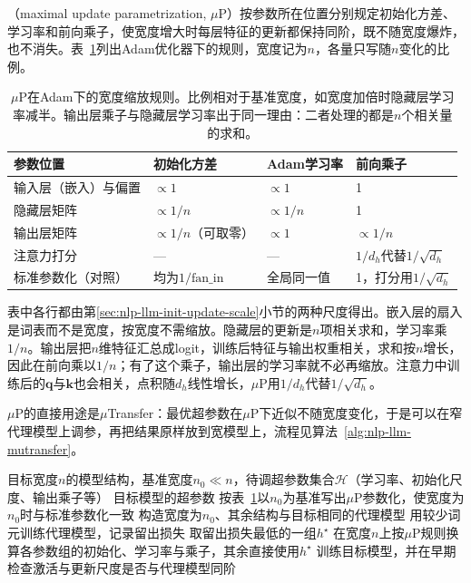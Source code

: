 （maximal update parametrization, $\mu$P）按参数所在位置分别规定初始化方差、学习率和前向乘子，使宽度增大时每层特征的更新都保持同阶，既不随宽度爆炸，也不消失。表~\ref{tab:nlp-llm-mup}列出Adam优化器下的规则，宽度记为$n$，各量只写随$n$变化的比例。

\begin{table}[htbp]
 \centering
 \small
 \begin{tabular}{@{}llll@{}}
  \toprule
  参数位置 & 初始化方差 & Adam学习率 & 前向乘子\\
  \midrule
  输入层（嵌入）与偏置 & $\propto1$ & $\propto1$ & 1\\
  隐藏层矩阵 & $\propto1/n$ & $\propto1/n$ & 1\\
  输出层矩阵 & $\propto1/n$（可取零） & $\propto1$ & $\propto1/n$\\
  注意力打分 & — & — & $1/d_h$代替$1/\sqrt{d_h}$\\
  \midrule
  标准参数化（对照） & 均为$1/\mathrm{fan\_in}$ & 全局同一值 & 1，打分用$1/\sqrt{d_h}$\\
  \bottomrule
 \end{tabular}
 \caption{$\mu$P在Adam下的宽度缩放规则。比例相对于基准宽度，如宽度加倍时隐藏层学习率减半。输出层乘子与隐藏层学习率出于同一理由：二者处理的都是$n$个相关量的求和。}
 \label{tab:nlp-llm-mup}
\end{table}

表中各行都由第\ref{sec:nlp-llm-init-update-scale}小节的两种尺度得出。嵌入层的扇入是词表而不是宽度，按宽度不需缩放。隐藏层的更新是$n$项相关求和，学习率乘$1/n$。输出层把$n$维特征汇总成logit，训练后特征与输出权重相关，求和按$n$增长，因此在前向乘以$1/n$；有了这个乘子，输出层的学习率就不必再缩放。注意力中训练后的$\bm q$与$\bm k$也会相关，点积随$d_h$线性增长，$\mu$P用$1/d_h$代替$1/\sqrt{d_h}$。

$\mu$P的直接用途是$\mu$Transfer：最优超参数在$\mu$P下近似不随宽度变化，于是可以在窄代理模型上调参，再把结果原样放到宽模型上，流程见算法~\ref{alg:nlp-llm-mutransfer}。

\begin{algorithm}[$\mu$Transfer超参数迁移]
  \label{alg:nlp-llm-mutransfer}
  \begin{algorithmic}[1]
    \Require 目标宽度$n$的模型结构，基准宽度$n_0\ll n$，待调超参数集合$\mathcal H$（学习率、初始化尺度、输出乘子等）
    \Ensure 目标模型的超参数
    \State 按表~\ref{tab:nlp-llm-mup}以$n_0$为基准写出$\mu$P参数化，使宽度为$n_0$时与标准参数化一致
    \State 构造宽度为$n_0$、其余结构与目标相同的代理模型
      \State 用较少词元训练代理模型，记录留出损失
    \EndFor
    \State 取留出损失最低的一组$h^\star$
    \State 在宽度$n$上按$\mu$P规则换算各参数组的初始化、学习率与乘子，其余直接使用$h^\star$
    \State 训练目标模型，并在早期检查激活与更新尺度是否与代理模型同阶
  \end{algorithmic}
\end{algorithm}

